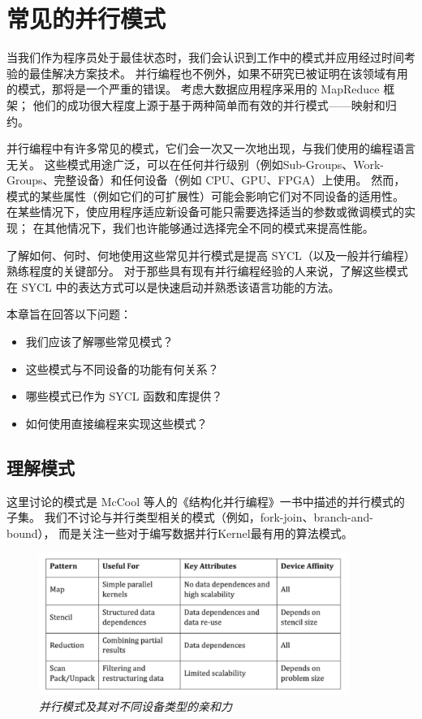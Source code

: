 \section{常见的并行模式}
当我们作为程序员处于最佳状态时，我们会认识到工作中的模式并应用经过时间考验的最佳解决方案技术。 
并行编程也不例外，如果不研究已被证明在该领域有用的模式，那将是一个严重的错误。 
考虑大数据应用程序采用的 MapReduce 框架； 他们的成功很大程度上源于基于两种简单而有效的并行模式——映射和归约。

并行编程中有许多常见的模式，它们会一次又一次地出现，与我们使用的编程语言无关。 
这些模式用途广泛，可以在任何并行级别（例如Sub-Groups、Work-Groups、完整设备）和任何设备（例如 CPU、GPU、FPGA）上使用。 
然而，模式的某些属性（例如它们的可扩展性）可能会影响它们对不同设备的适用性。 
在某些情况下，使应用程序适应新设备可能只需要选择适当的参数或微调模式的实现； 
在其他情况下，我们也许能够通过选择完全不同的模式来提高性能。

了解如何、何时、何地使用这些常见并行模式是提高 SYCL（以及一般并行编程）熟练程度的关键部分。 
对于那些具有现有并行编程经验的人来说，了解这些模式在 SYCL 中的表达方式可以是快速启动并熟悉该语言功能的方法。

本章旨在回答以下问题：

\begin{itemize}
	\item 我们应该了解哪些常见模式？

	\item 这些模式与不同设备的功能有何关系？

	\item 哪些模式已作为 SYCL 函数和库提供？

	\item 如何使用直接编程来实现这些模式？
\end{itemize}


\subsection{理解模式}
这里讨论的模式是 McCool 等人的《结构化并行编程》一书中描述的并行模式的子集。 
我们不讨论与并行类型相关的模式（例如，fork-join、branch-and-bound），
而是关注一些对于编写数据并行Kernel最有用的算法模式。

\begin{figure}[H]
	\centering
	\includegraphics[width=0.9\textwidth]{figs/F14.1.png}
	\caption{\textit{并行模式及其对不同设备类型的亲和力 }}
\end{figure}

